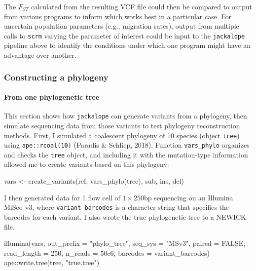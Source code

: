 \documentclass[12pt,]{article}
\newenvironment{Shaded}{}{}
\newcommand{\DataTypeTok}[1]{#1}
\newcommand{\DecValTok}[1]{#1}
\newcommand{\FloatTok}[1]{#1}
\newcommand{\KeywordTok}[1]{\textcolor[rgb]{0.00,0.00,1.00}{#1}}
\newcommand{\NormalTok}[1]{#1}
\newcommand{\OperatorTok}[1]{#1}
\newcommand{\OtherTok}[1]{\textcolor[rgb]{1.00,0.25,0.00}{#1}}
\newcommand{\StringTok}[1]{\textcolor[rgb]{0.00,0.50,0.50}{#1}}
\let\oldparagraph\paragraph
\renewcommand{\paragraph}[1]{\oldparagraph{#1}\mbox{}}
\begin{document}
The \(F_{ST}\) calculated from the resulting VCF file could then be compared to output
from various programs to inform which works best in a particular case.
For uncertain population parameters (e.g., migration rates), output from
multiple calls to \texttt{scrm} varying the parameter of interest could be input to
the \texttt{jackalope} pipeline above to identify the conditions under which one program
might have an advantage over another.

\hypertarget{constructing-a-phylogeny}{%
\subsubsection{Constructing a phylogeny}\label{constructing-a-phylogeny}}

\hypertarget{from-one-phylogenetic-tree}{%
\paragraph{From one phylogenetic tree}\label{from-one-phylogenetic-tree}}

This section shows how \texttt{jackalope} can generate variants from a phylogeny, then
simulate sequencing data from those variants to test phylogeny reconstruction methods.
First, I simulated a coalescent phylogeny of 10 species (object \texttt{tree}) using
\texttt{ape::rcoal(10)} (Paradis \& Schliep, 2018).
Function \texttt{vars\_phylo} organizes and checks the \texttt{tree} object, and
including it with the mutation-type information allowed me to create variants based
on this phylogeny:

\begin{Shaded}
\begin{Highlighting}[]
\NormalTok{vars <-}\StringTok{ }\KeywordTok{create_variants}\NormalTok{(ref, }\KeywordTok{vars_phylo}\NormalTok{(tree), sub, ins, del)}
\end{Highlighting}
\end{Shaded}

I then generated data for 1 flow cell of \(1 \times 250\)bp sequencing
on an Illumina MiSeq v3, where \texttt{variant\_barcodes} is a character string that specifies
the barcodes for each variant.
I also wrote the true phylogenetic tree to a NEWICK file.

\begin{Shaded}
\begin{Highlighting}[]
\KeywordTok{illumina}\NormalTok{(vars, }\DataTypeTok{out_prefix =} \StringTok{"phylo_tree"}\NormalTok{, }\DataTypeTok{seq_sys =} \StringTok{"MSv3"}\NormalTok{,}
         \DataTypeTok{paired =} \OtherTok{FALSE}\NormalTok{, }\DataTypeTok{read_length =} \DecValTok{250}\NormalTok{, }\DataTypeTok{n_reads =} \FloatTok{50e6}\NormalTok{,}
         \DataTypeTok{barcodes =}\NormalTok{ variant_barcodes)}
\NormalTok{ape}\OperatorTok{::}\KeywordTok{write.tree}\NormalTok{(tree, }\StringTok{"true.tree"}\NormalTok{)}
\end{Highlighting}
\end{Shaded}
\end{document}
